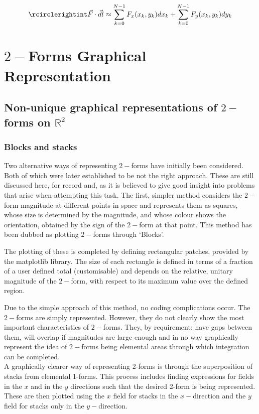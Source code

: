 \documentclass[12pt]{report}
\begin{document}
\begin{equation}
	\rcirclerightint \vec{F} \cdot \vec{dl} \approx \sum_{k=0}^{N-1} F_x(x_k,y_k)dx_k + \sum_{k=0}^{N-1} F_y(x_k,y_k)dy_k
\end{equation}


\chapter{$2-$Forms Graphical Representation}

\section{Non-unique graphical representations of $2-$forms on $\mathbb{R}^{2}$}
\subsection{Blocks and stacks}
Two alternative ways of representing $2-$forms have initially been considered. Both of which were later established to be not the right approach. These are still discussed here, for record and, as it is believed to give good insight into problems that arise when attempting this task. 
The first, simpler method considers the $2-$form magnitude at different points in space and represents them as squares, whose size is determined by the magnitude, and whose colour shows the orientation, obtained by the sign of the $2-$form at that point. This method has been dubbed as plotting $2-$forms through `Blocks'.

\noindent The plotting of these is completed by defining rectangular patches, provided by the matplotlib library. The size of each rectangle is defined in terms of a fraction of a user defined total (customisable) and depends on the relative, unitary magnitude of the $2-$form, with respect to its maximum value over the defined region.

\noindent Due to the simple approach of this method, no coding complications occur. The $2-$forms are simply represented. However, they do not clearly show the most important characteristics of $2-$forms. They, by requirement: have gaps between them, will overlap if magnitudes are large enough and in no way graphically represent the idea of $2-$forms being elemental areas through which integration can be completed.\\

A graphically clearer way of representing 2-forms is through the superposition of stacks from elemental 1-forms. This process includes finding expressions for fields in the $x$ and in the $y$ directions such that the desired 2-form is being represented. These are then plotted using the $x$ field for stacks in the $x-$direction and the $y$ field for stacks only in the $y-$direction.
\end{document}
